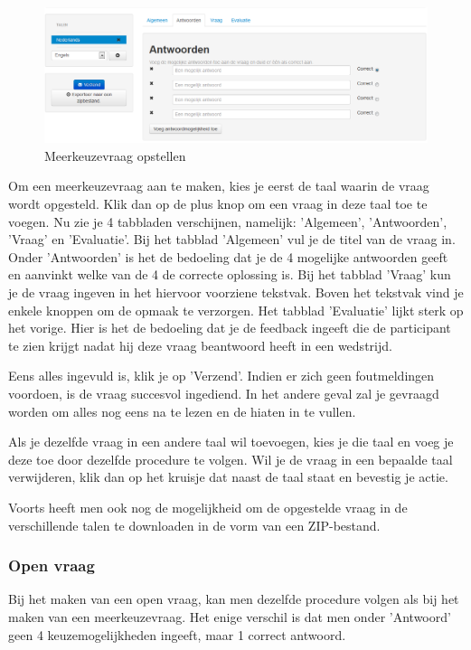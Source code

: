 \documentclass[]{article}
\begin{document}
\begin{figure}[!ht]
	\centering
	\includegraphics[width=1\textwidth]{img/mcq}
	\caption{Meerkeuzevraag opstellen}
	\label{mcq}
\end{figure}

Om een meerkeuzevraag aan te maken, kies je eerst de taal waarin de vraag wordt opgesteld. Klik dan op de plus knop om een vraag in deze taal toe te voegen. Nu zie je 4 tabbladen verschijnen, namelijk: 'Algemeen', 'Antwoorden', 'Vraag' en 'Evaluatie'. Bij het tabblad 'Algemeen' vul je de titel van de vraag in. Onder 'Antwoorden' is het de bedoeling dat je de 4 mogelijke antwoorden geeft en aanvinkt welke van de 4 de correcte oplossing is. Bij het tabblad 'Vraag' kun je de vraag ingeven in het hiervoor voorziene tekstvak. Boven het tekstvak vind je enkele knoppen om de opmaak te verzorgen. Het tabblad 'Evaluatie' lijkt sterk op het vorige. Hier is het de bedoeling dat je de feedback ingeeft die de participant te zien krijgt nadat hij deze vraag beantwoord heeft in een wedstrijd. 

Eens alles ingevuld is, klik je op 'Verzend'. Indien er zich geen foutmeldingen voordoen, is de vraag succesvol ingediend. In het andere geval zal je gevraagd worden om alles nog eens na te lezen en de hiaten in te vullen.

Als je dezelfde vraag in een andere taal wil toevoegen, kies je die taal en voeg je deze toe door dezelfde procedure te volgen. Wil je de vraag in een bepaalde taal verwijderen, klik dan op het kruisje dat naast de taal staat en bevestig je actie. 

Voorts heeft men ook nog de mogelijkheid om de opgestelde vraag in de verschillende talen te downloaden in de vorm van een ZIP-bestand. 

\subsubsection{Open vraag}

Bij het maken van een open vraag, kan men dezelfde procedure volgen als bij het maken van een meerkeuzevraag. Het enige verschil is dat men onder 'Antwoord' geen 4 keuzemogelijkheden ingeeft, maar 1 correct antwoord.
\end{document}
